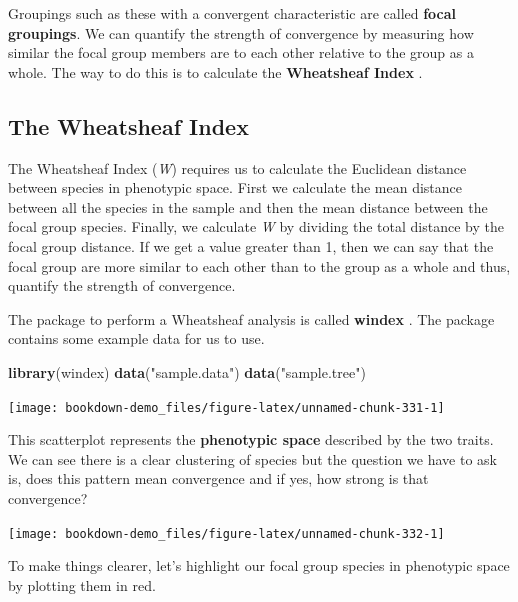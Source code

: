 \documentclass[
]{book}
\newenvironment{Shaded}{\begin{snugshade}}{\end{snugshade}}
\newcommand{\KeywordTok}[1]{\textcolor[rgb]{0.13,0.29,0.53}{\textbf{#1}}}
\newcommand{\NormalTok}[1]{#1}
\newcommand{\StringTok}[1]{\textcolor[rgb]{0.31,0.60,0.02}{#1}}
\begin{document}
Groupings such as these with a convergent characteristic are called \textbf{focal groupings}. We can quantify the strength of convergence by measuring how similar the focal group members are to each other relative to the group as a whole. The way to do this is to calculate the \textbf{Wheatsheaf Index} \citep{Arbuckle14}.

\hypertarget{the-wheatsheaf-index}{%
\subsection{The Wheatsheaf Index}\label{the-wheatsheaf-index}}

The Wheatsheaf Index (\emph{W}) requires us to calculate the Euclidean distance between species in phenotypic space. First we calculate the mean distance between all the species in the sample and then the mean distance between the focal group species. Finally, we calculate \emph{W} by dividing the total distance by the focal group distance. If we get a value greater than 1, then we can say that the focal group are more similar to each other than to the group as a whole and thus, quantify the strength of convergence.

The package to perform a Wheatsheaf analysis is called \textbf{windex} \citep{windex}. The package contains some example data for us to use.

\begin{Shaded}
\begin{Highlighting}[]
\KeywordTok{library}\NormalTok{(windex)}
\KeywordTok{data}\NormalTok{(}\StringTok{"sample.data"}\NormalTok{)}
\KeywordTok{data}\NormalTok{(}\StringTok{"sample.tree"}\NormalTok{)}
\end{Highlighting}
\end{Shaded}

\begin{center}\texttt{[image: bookdown-demo\_files/figure-latex/unnamed-chunk-331-1]} \end{center}

This scatterplot represents the \textbf{phenotypic space} described by the two traits. We can see there is a clear clustering of species but the question we have to ask is, does this pattern mean convergence and if yes, how strong is that convergence?

\begin{center}\texttt{[image: bookdown-demo\_files/figure-latex/unnamed-chunk-332-1]} \end{center}

To make things clearer, let's highlight our focal group species in phenotypic space by plotting them in red.
\end{document}
